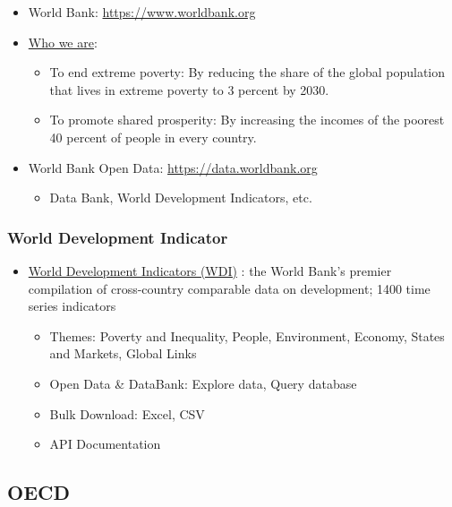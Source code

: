 \documentclass[
]{bxjsbook}
\providecommand{\tightlist}{%
  \setlength{\itemsep}{0pt}\setlength{\parskip}{0pt}}
\theoremstyle{definition}
\theoremstyle{definition}
\theoremstyle{definition}
\theoremstyle{definition}
\theoremstyle{remark}
\begin{document}
\begin{itemize}
\tightlist
\item
  World Bank: \url{https://www.worldbank.org}
\item
  \href{https://www.worldbank.org/en/who-we-are}{Who we are}:

  \begin{itemize}
  \tightlist
  \item
    To end extreme poverty: By reducing the share of the global population that lives in extreme poverty to 3 percent by 2030.
  \item
    To promote shared prosperity: By increasing the incomes of the poorest 40 percent of people in every country.
  \end{itemize}
\item
  World Bank Open Data: \url{https://data.worldbank.org}

  \begin{itemize}
  \tightlist
  \item
    Data Bank, World Development Indicators, etc.
  \end{itemize}
\end{itemize}

\hypertarget{world-development-indicator}{%
\subsubsection{World Development Indicator}\label{world-development-indicator}}

\begin{itemize}
\tightlist
\item
  \href{https://datatopics.worldbank.org/world-development-indicators/}{World Development Indicators (WDI)} : the World Bank's premier compilation of cross-country comparable data on development; 1400 time series indicators

  \begin{itemize}
  \tightlist
  \item
    Themes: Poverty and Inequality, People, Environment, Economy, States and Markets, Global Links
  \item
    Open Data \& DataBank: Explore data, Query database
  \item
    Bulk Download: Excel, CSV
  \item
    API Documentation
  \end{itemize}
\end{itemize}

\hypertarget{oecd}{%
\subsection{OECD}\label{oecd}}
\end{document}
